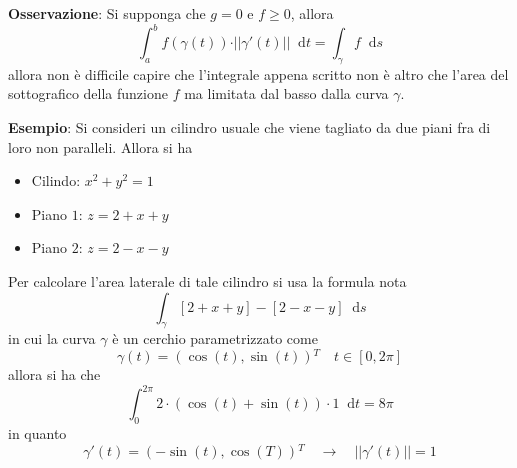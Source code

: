 \documentclass[a4paper]{extarticle}
\newcommand*\dif{\mathop{}\!\mathrm{d}}
\begin{document}
\vspace{1em}
\noindent
\textbf{Osservazione}: Si supponga che $g=0$ e $f \geq 0$, allora
\[\int_a^b f(\gamma(t)) \cdot \vert\vert \gamma'(t) \vert \vert \dif t = \int_\gamma f \dif s\]
allora non è difficile capire che l'integrale appena scritto non è altro che l'area del sottografico della funzione $f$ ma limitata dal basso dalla curva $\gamma$.

\vspace{2em}
\noindent
\textbf{Esempio}: Si consideri un cilindro usuale che viene tagliato da due piani fra di loro non paralleli. Allora si ha
\begin{itemize}
    \item Cilindo: $x^2+y^2=1$
    \item Piano $1$: $z=2+x+y$
    \item Piano $2$: $z=2-x-y$
\end{itemize}
Per calcolare l'area laterale di tale cilindro si usa la formula nota
\[\int_\gamma [2+x+y] - [2-x-y] \dif s\]
in cui la curva $\gamma$ è un cerchio parametrizzato come
\[\gamma(t)=(\cos(t),\sin(t)){^T} \hspace{1em} t \in [0,2\pi]\]
allora si ha che
\[\int_0^{2\pi} 2 \cdot (\cos(t) + \sin(t)) \cdot 1 \dif t=8\pi\]
in quanto
\[\gamma'(t)=(-\sin(t),\cos(T)){^T} \hspace{1em} \rightarrow \hspace{1em} \vert \vert \gamma'(t) \vert \vert = 1\]

\vspace{1em}
\end{document}

